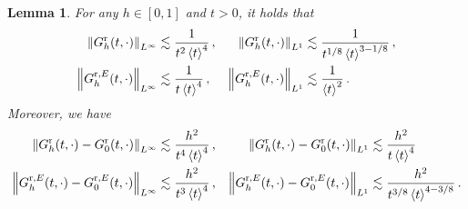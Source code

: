 \documentclass[a4paper,12pt]{amsart} %
\theoremstyle{plain}
\newtheorem{lem}[thm]{Lemma}
\theoremstyle{definition}
\newcommand		{\lt}			{\left}				%
\newcommand		{\rt}			{\right}			%
\renewcommand	{\(}			{\lt(}
\renewcommand	{\)}			{\rt)}
\newcommand		{\bangle}[1]	{\lt\langle #1\rt\rangle}
\newcommand		{\weight}[1]	{\bangle{#1}}	%
\newcommand		{\nrm}[1]		{\lt\lVert{#1}\rt\rVert}		%
\newcommand		{\Nrm}[2]		{\nrm{#1}_{#2}}
\newcommand		{\eps}			{\varepsilon}
\newcommand	{\h}			{h}
\newcommand		{\Gr}			{G^{\textnormal{r}}}
\newcommand		{\GrE}			{G^{\textnormal{r},E}}
\begin{document}
	\begin{lem}\label{lem:decay_Gr}
		For any $h\in[0,1]$ and $t>0$, it holds that
		\begin{align*}
			\Nrm{\Gr_\h(t,\cdot)}{L^\infty} &\lesssim \frac{1}{t^2\weight{t}^4} \,  ,
			&
			\Nrm{\Gr_\h(t,\cdot)}{L^1} &\lesssim \frac{1}{t^{1/8}\weight{t}^{3-1/8}} \,  ,
			\\
			\Nrm{\GrE_\h(t,\cdot)}{L^\infty} &\lesssim \frac{1}{t\weight{t}^4} \,  ,
			&
			\Nrm{\GrE_\h(t,\cdot)}{L^1} &\lesssim \frac{1}{\weight{t}^{2}} \, . 
		\end{align*}
		Moreover, we have
		\begin{align*}
			\Nrm{\Gr_\h(t,\cdot) - \Gr_0(t,\cdot)}{L^\infty} &\lesssim \frac{h^2}{t^4\weight{t}^4} \, ,
			&
			\Nrm{\Gr_\h(t,\cdot) - \Gr_0(t,\cdot)}{L^1} &\lesssim \frac{h^{2}}{t\weight{t}^{4}} %
			\\
			\Nrm{\GrE_\h(t,\cdot) - \GrE_0(t,\cdot)}{L^\infty} &\lesssim \frac{h^2}{t^3\weight{t}^4} \, ,
			&
			\Nrm{\GrE_\h(t,\cdot) - \GrE_0(t,\cdot)}{L^1} &\lesssim \frac{h^{2}}{t^{3/8}\weight{t}^{4-3/8}} \, .
		\end{align*}
	\end{lem}
\end{document}
